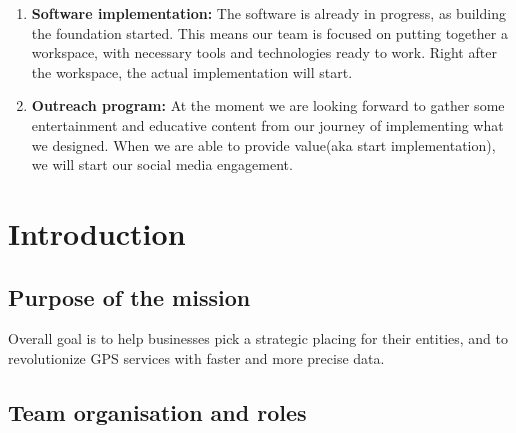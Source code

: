 \documentclass[11pt]{article}
\begin{document}
\begin{enumerate}
    \item\textbf{Software implementation:} {The software is already in progress, as building the foundation started. This means our team is focused on putting together a workspace, with necessary tools and technologies ready to work. Right after the workspace, the actual implementation will start.}
    \item\textbf{Outreach program:} {At the moment we are looking forward to gather some entertainment and educative content from our journey of implementing what we designed. When we are able to provide value(aka start implementation), we will start our social media engagement.}
\end{enumerate}





\section{Introduction}

\subsection{Purpose of the mission}
Overall goal is to help businesses pick a strategic placing for their entities, and to revolutionize GPS services with faster and more precise data. 

\subsection{Team organisation and roles}
\end{document}
